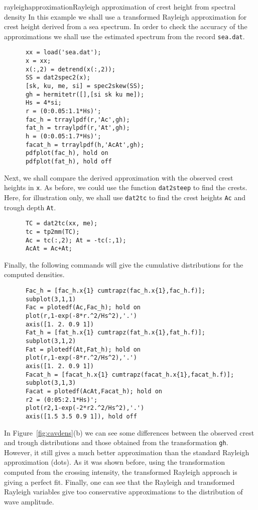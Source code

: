 \begin{rtex}{rayleighapproximation}{Rayleigh approximation of crest
height from spectral density}
In this example we shall use a transformed Rayleigh approximation for
crest height derived from a sea spectrum. In order to check the
accuracy of the approximations we shall use the estimated spectrum
from the record {\tt sea.dat}.
{\small\begin{verbatim}
      xx = load('sea.dat');
      x = xx;
      x(:,2) = detrend(x(:,2));
      SS = dat2spec2(x);
      [sk, ku, me, si] = spec2skew(SS);
      gh = hermitetr([],[si sk ku me]);
      Hs = 4*si;
      r = (0:0.05:1.1*Hs)';
      fac_h = trraylpdf(r,'Ac',gh);
      fat_h = trraylpdf(r,'At',gh);
      h = (0:0.05:1.7*Hs)';
      facat_h = trraylpdf(h,'AcAt',gh);
      pdfplot(fac_h), hold on
      pdfplot(fat_h), hold off
\end{verbatim}}

Next, we shall compare the derived approximation with the observed
crest heights in {\tt x}. As before, we could use the function {\tt dat2steep}
to find the crests. Here, for illustration only,  we shall use
{\tt dat2tc}
to find the crest heights {\tt Ac} and trough depth {\tt At}.
{\small\begin{verbatim}
      TC = dat2tc(xx, me);
      tc = tp2mm(TC);
      Ac = tc(:,2); At = -tc(:,1);
      AcAt = Ac+At;
\end{verbatim}}

Finally, the following commands will give the cumulative distributions
for the computed densities.
{\small\begin{verbatim}
      Fac_h = [fac_h.x{1} cumtrapz(fac_h.x{1},fac_h.f)];
      subplot(3,1,1)
      Fac = plotedf(Ac,Fac_h); hold on
      plot(r,1-exp(-8*r.^2/Hs^2),'.')
      axis([1. 2. 0.9 1])
      Fat_h = [fat_h.x{1} cumtrapz(fat_h.x{1},fat_h.f)];
      subplot(3,1,2)
      Fat = plotedf(At,Fat_h); hold on
      plot(r,1-exp(-8*r.^2/Hs^2),'.')
      axis([1. 2. 0.9 1])
      Facat_h = [facat_h.x{1} cumtrapz(facat_h.x{1},facat_h.f)];
      subplot(3,1,3)
      Facat = plotedf(AcAt,Facat_h); hold on
      r2 = (0:05:2.1*Hs)';
      plot(r2,1-exp(-2*r2.^2/Hs^2),'.')
      axis([1.5 3.5 0.9 1]), hold off
\end{verbatim}}

In Figure~\ref{fig:cavdens}(b) we can see some differences between the
observed crest and trough distributions and those obtained from the
transformation {\tt gh}.  However, it still gives a much better
approximation than the standard Rayleigh approximation (dots).
As it was shown before, using the transformation computed from the
crossing intensity, the transformed Rayleigh approach is giving
a perfect fit. Finally, one can see that the Rayleigh and transformed
Rayleigh variables give too conservative approximations to
the distribution of wave amplitude.
\end{rtex}

